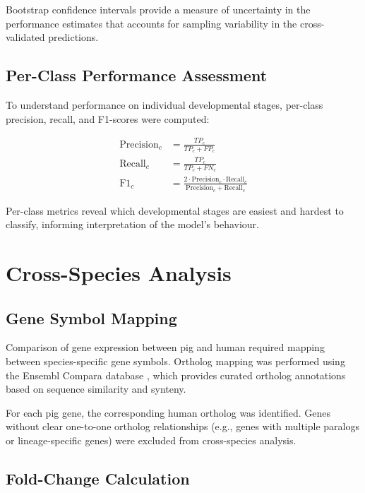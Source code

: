 Bootstrap confidence intervals provide a measure of uncertainty in the performance estimates that accounts for sampling variability in the cross-validated predictions.

\subsection{Per-Class Performance Assessment}

To understand performance on individual developmental stages, per-class precision, recall, and F1-scores were computed:

\begin{align}
    \text{Precision}_c &= \frac{TP_c}{TP_c + FP_c} \label{eq:precision} \\
    \text{Recall}_c &= \frac{TP_c}{TP_c + FN_c} \label{eq:recall} \\
    \text{F1}_c &= \frac{2 \cdot \text{Precision}_c \cdot \text{Recall}_c}{\text{Precision}_c + \text{Recall}_c} \label{eq:f1}
\end{align}

Per-class metrics reveal which developmental stages are easiest and hardest to classify, informing interpretation of the model's behaviour.


\section{Cross-Species Analysis}\label{sec:methods:crossspecies}

\subsection{Gene Symbol Mapping}

Comparison of gene expression between pig and human required mapping between species-specific gene symbols. Ortholog mapping was performed using the Ensembl Compara database \parencite{cunningham_ensembl_2022}, which provides curated ortholog annotations based on sequence similarity and synteny.

For each pig gene, the corresponding human ortholog was identified. Genes without clear one-to-one ortholog relationships (e.g., genes with multiple paralogs or lineage-specific genes) were excluded from cross-species analysis.

\subsection{Fold-Change Calculation}

